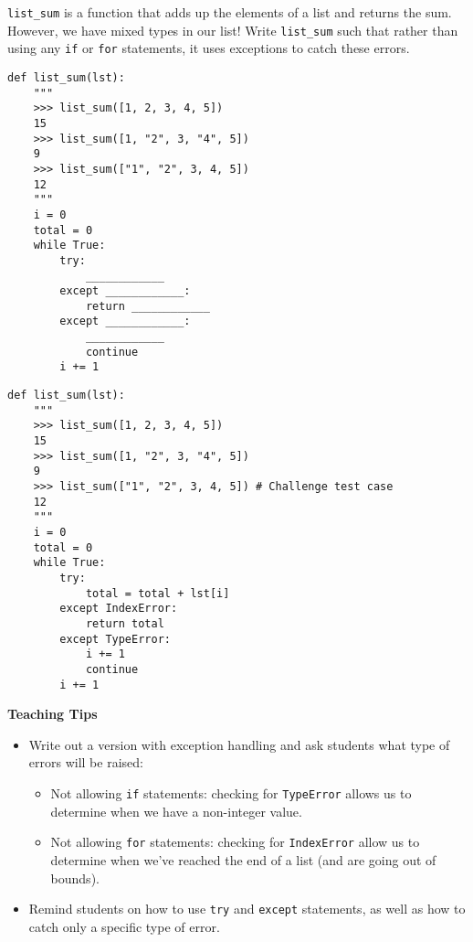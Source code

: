\begin{blocksection}
\question \lstinline{list_sum} is a function that adds up the elements of a list and returns the sum. However, we have mixed types in our list! Write \lstinline{list_sum} such that rather than using any \lstinline{if} or \lstinline{for} statements, it uses exceptions to catch these errors.

\end{blocksection}

\ifprintanswers\else
\begin{lstlisting}
def list_sum(lst):
    """
    >>> list_sum([1, 2, 3, 4, 5])
    15
    >>> list_sum([1, "2", 3, "4", 5])
    9
    >>> list_sum(["1", "2", 3, 4, 5])
    12
    """
    i = 0
    total = 0
    while True:
        try:
            ____________
        except ____________:
            return ____________
        except ____________:
            ____________
            continue
        i += 1
\end{lstlisting}
\fi

\begin{solution}
\begin{blocksection}
\begin{lstlisting}
def list_sum(lst):
    """
    >>> list_sum([1, 2, 3, 4, 5])
    15
    >>> list_sum([1, "2", 3, "4", 5])
    9
    >>> list_sum(["1", "2", 3, 4, 5]) # Challenge test case
    12
    """
    i = 0
    total = 0
    while True:
        try:
            total = total + lst[i]
        except IndexError:
            return total
        except TypeError:
            i += 1
            continue
        i += 1
\end{lstlisting}
\end{blocksection}
\end{solution}

\begin{guide}
\begin{blocksection}
\textbf{Teaching Tips}
\begin{itemize}
    \item Write out a version with exception handling and ask students what type of errors will be raised:
    \begin{itemize}
        \item Not allowing \lstinline{if} statements: checking for \lstinline{TypeError} allows us to determine when we have a non-integer value.
        \item Not allowing \lstinline{for} statements: checking for \lstinline{IndexError} allow us to determine when we've reached the end of a list (and are going out of bounds). 
    \end{itemize}
    \item Remind students on how to use \lstinline{try} and \lstinline{except} statements, as well as how to catch only a specific type of error. 
    
\end{itemize}
\end{blocksection}
\end{guide}